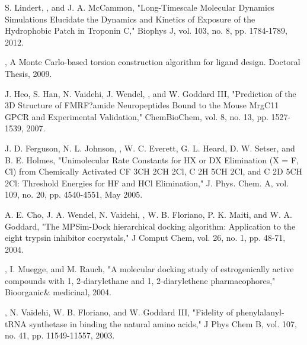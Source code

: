 \begin{etaremune}
\item S. Lindert, \pmkh, and J. A. McCammon, "Long-Timescale Molecular Dynamics Simulations Elucidate the Dynamics and Kinetics of Exposure of the Hydrophobic Patch in Troponin C," Biophys J, vol. 103, no. 8, pp. 1784-1789, 2012. 
\item \pmkh, A Monte Carlo-based torsion construction algorithm for ligand design. Doctoral Thesis, 2009. 
\item J. Heo, S. Han, N. Vaidehi, J. Wendel, \pmkh, and W. Goddard III, "Prediction of the 3D Structure of FMRF?amide Neuropeptides Bound to the Mouse MrgC11 GPCR and Experimental Validation," ChemBioChem, vol. 8, no. 13, pp. 1527-1539, 2007.
\item J. D. Ferguson, N. L. Johnson, \pmkh, W. C. Everett, G. L. Heard, D. W. Setser, and B. E. Holmes, "Unimolecular Rate Constants for HX or DX Elimination (X = F, Cl) from Chemically Activated CF 3CH 2CH 2Cl, C 2H 5CH 2Cl, and C 2D 5CH 2Cl:  Threshold Energies for HF and HCl Elimination," J. Phys. Chem. A, vol. 109, no. 20, pp. 4540-4551, May 2005.
\item A. E. Cho, J. A. Wendel, N. Vaidehi, \pmkh, W. B. Floriano, P. K. Maiti, and W. A. Goddard, "The MPSim-Dock hierarchical docking algorithm: Application to the eight trypsin inhibitor cocrystals," J Comput Chem, vol. 26, no. 1, pp. 48-71, 2004.
\item \pmkh, I. Muegge, and M. Rauch, "A molecular docking study of estrogenically active compounds with 1, 2-diarylethane and 1, 2-diarylethene pharmacophores," Bioorganic\& medicinal, 2004.
\item \pmkh, N. Vaidehi, W. B. Floriano, and W. Goddard III, "Fidelity of phenylalanyl-tRNA synthetase in binding the natural amino acids," J Phys Chem B, vol. 107, no. 41, pp. 11549-11557, 2003. %

\end{etaremune}
